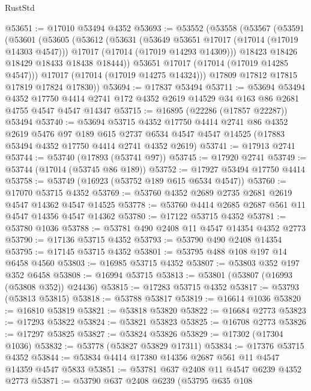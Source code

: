 \begin{lexlean}{RustStd}
\begin{coremodule}
@53651 := @17010 @53494 @4352
@53693 := @53552
    (@53558
      (@53567
        (@53591
          (@53601
            (@53605
              (@53612
                (@53631
                  (@53649 @53651 @17017 (@17014 (@17019 @14303 @4547)))
                  @17017
                  (@17014 (@17019 @14293 @14309)))
                @18423
                @18426
                @18429
                @18433
                @18438
                @18444))
            @53651
            @17017
            (@17014 (@17019 @14285 @4547)))
          @17017
          (@17014 (@17019 @14275 @14324)))
        @17809
        @17812
        @17815
        @17819
        @17824
        @17830))
@53694 := @17837 @53494
@53711 := @53694
    @53494
    @4352
    @17750
    @4414
    @2741
    @172
    @4352
    @2619
    @14529
    @34
    @163
    @86
    @2681
    @4755
    @4547
    @4547
    @14347
@53715 := @16895 (@22286 (@17857 @22287)) @53494
@53740 := @53694
    @53715
    @4352
    @17750
    @4414
    @2741
    @86
    @4352
    @2619
    @5476
    @97
    @189
    @615
    @2737
    @6534
    @4547
    @4547
    @14525
    (@17883 @53494 @4352 @17750 @4414 @2741 @4352 @2619)
@53741 := @17913 @2741
@53744 := @53740 (@17893 (@53741 @97))
@53745 := @17920 @2741
@53749 := @53744 (@17014 (@53745 @86 @189))
@53752 := @17927 @53494 @17750 @4414
@53758 := @53749 (@16923 (@53752 @189 @615 @6534 @4547))
@53760 := @17070 @53715 @4352
@53769 := @53760 @4352 @2689 @2735 @2681 @2619 @4547 @14362 @4547 @14525
@53778 := @53760 @4414 @2685 @2687 @561 @11 @4547 @14356 @4547 @14362
@53780 := @17122 @53715 @4352
@53781 := @53780 @1036
@53788 := @53781 @490 @2408 @11 @4547 @14354 @4352 @2773
@53790 := @17136 @53715 @4352
@53793 := @53790 @490 @2408 @14354
@53795 := @17145 @53715 @4352
@53801 := @53795 @488 @108 @197 @14 @6458 @4560
@53803 := @16985 @53715 @4352
@53807 := @53803 @352 @197 @352 @6458
@53808 := @16994 @53715
@53813 := @53801 (@53807 (@16993 (@53808 @352)) @24436)
@53815 := @17283 @53715 @4352
@53817 := @53793 (@53813 @53815)
@53818 := @53788 @53817
@53819 := @16614 @1036
@53820 := @16810 @53819
@53821 := @53818 @53820
@53822 := @16684 @2773
@53823 := @17293 @53822
@53824 := @53821 @53823
@53825 := @16708 @2773
@53826 := @17297 @53825
@53827 := @53824 @53826
@53829 := @17302 (@17304 @1036)
@53832 := @53778 (@53827 @53829 @17311)
@53834 := @17376 @53715 @4352
@53844 := @53834 @4414 @17380 @14356 @2687 @561 @11 @4547 @14359 @4547 @5833
@53851 := @53781 @637 @2408 @11 @4547 @6239 @4352 @2773
@53871 := @53790
    @637
    @2408
    @6239
    (@53795
      @635
      @108

\end{coremodule}
\end{lexlean}
